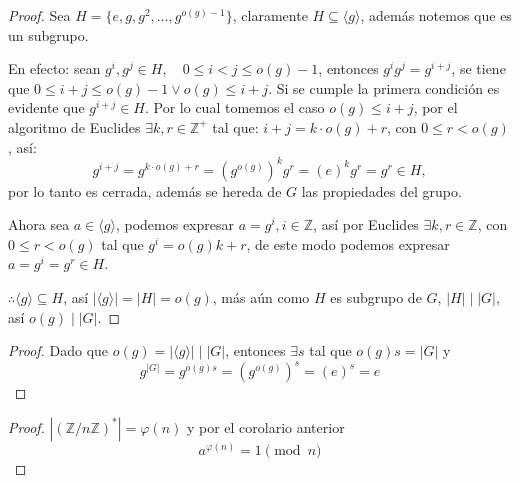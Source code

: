 \begin{proof}
	Sea $H = \{ e, g, g^2, \dots, g^{o(g)-1} \}$, claramente $H \subseteq \langle g \rangle$, además notemos que es un subgrupo.

	En efecto: sean $g^i, g^j \in H, \quad 0 \le i < j \le o(g)-1$, entonces $g^i g^j = g^{i+j}$, se tiene que $0 \le i+j \le o(g)-1 \lor o(g) \le i+j$. Si se cumple la primera condición es evidente que $g^{i+j} \in H$.
	Por lo cual tomemos el caso $o(g) \le i+j$, por el algoritmo de Euclides $\exists k, r \in \mathbb{Z}^+$ tal que:
	$i+j = k \cdot o(g) + r$, con $0 \le r < o(g)$, así:
	\begin{equation*}
		g^{i+j} = g^{k \cdot o(g) + r} = (g^{o(g)})^k g^r = (e)^k g^r = g^r \in H,
	\end{equation*}
	por lo tanto es cerrada, además se hereda de $G$ las propiedades del grupo.

	Ahora sea $a \in \langle g \rangle$, podemos expresar $a = g^i, i \in \mathbb{Z}$, así por Euclides $\exists k, r \in \mathbb{Z}$, con $0 \le r < o(g)$ tal que $g^i = o(g)k + r$, de este modo podemos expresar $a = g^i = g^r \in H$.

	$\therefore \langle g \rangle \subseteq H$, así $|\langle g \rangle| = |H| = o(g)$, más aún como $H$ es subgrupo de $G$, $|H| \mid |G|$, así $o(g) \mid |G|$.
\end{proof}


\begin{proof}
	Dado que $o(g) = |\langle g \rangle| \mid |G|$, entonces $\exists s$ tal que $o(g)s = |G|$ y
	\begin{equation*}
		g^{|G|} = g^{o(g)s} = (g^{o(g)})^s = (e)^s = e
	\end{equation*}
\end{proof}


\begin{proof}
	$|(\mathbb{Z}/n\mathbb{Z})^*| = \varphi(n)$ y por el corolario anterior
	\begin{equation*}
		a^{\varphi(n)} = 1 \pmod n
	\end{equation*}
\end{proof}


